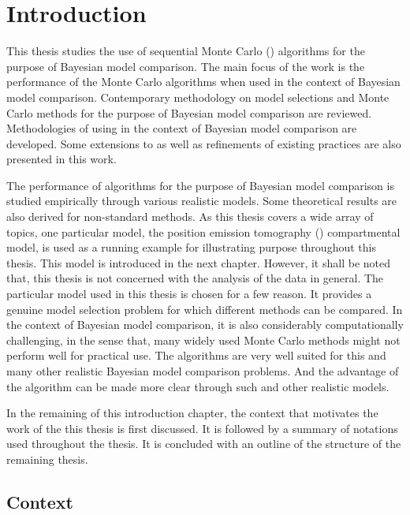\chapter{Introduction}
\label{cha:Introduction}

\begin{draftpar}
This thesis studies the use of sequential Monte Carlo (\smc) algorithms for the purpose of Bayesian model comparison. The main focus of the work is the performance of the Monte Carlo algorithms when used in the context of Bayesian model comparison. Contemporary methodology on model selections and Monte Carlo methods for the purpose of Bayesian model comparison are reviewed. Methodologies of using \smc in the context of Bayesian model comparison are developed. Some extensions to as well as refinements of existing \smc practices are also presented in this work.

The performance of \smc algorithms for the purpose of Bayesian model comparison is studied empirically through various realistic models. Some theoretical results are also derived for non-standard methods. As this thesis covers a wide array of topics, one particular model, the position emission tomography (\pet) compartmental model, is used as a running example for illustrating purpose throughout this thesis. This model is introduced in the next chapter. However, it shall be noted that, this thesis is not concerned with the analysis of the \pet data in general. The particular model used in this thesis is chosen for a few reason. It provides a genuine model selection problem for which different methods can be compared. In the context of Bayesian model comparison, it is also considerably computationally challenging, in the sense that, many widely used Monte Carlo methods might not perform well for practical use. The \smc algorithms are very well suited for this and many other realistic Bayesian model comparison problems. And the advantage of the \smc algorithm can be made more clear through such and other realistic models.

In the remaining of this introduction chapter, the context that motivates the work of the this thesis is first discussed. It is followed by a summary of notations used throughout the thesis. It is concluded with an outline of the structure of the remaining thesis.
\end{draftpar}

\section{Context}
\label{sec:Context}

